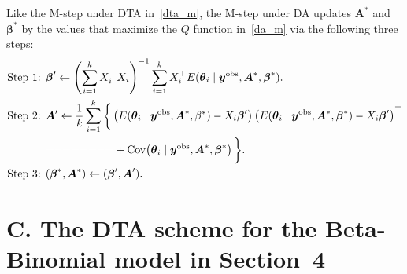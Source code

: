 \documentclass[12pt]{article}
\begin{document}
\begin{appendix}
Like the M-step under DTA in~\eqref{dta_m}, the M-step under DA updates $\boldsymbol{A}^\ast$ and $\boldsymbol{\beta}^\ast$ by the values that maximize the $Q$ function in~\eqref{da_m} via the following three steps:
\begin{align}
\begin{aligned}
\textrm{Step 1: }& \boldsymbol{\beta}' \gets\left(\sum_{i=1}^kX_i^\top X_i\right)^{-1}\sum_{i=1}^kX_i^\top E(
\boldsymbol{\theta}_i\mid \boldsymbol{y}^{\textrm{obs}}, \boldsymbol{A}^\ast, \boldsymbol{\beta}^\ast).\nonumber\\
\textrm{Step 2: }& \boldsymbol{A}' \gets \frac{1}{k}\sum_{i=1}^k\bigg\{\left(E(\boldsymbol{\theta}_i \mid \boldsymbol{y}^{\textrm{obs}}, \boldsymbol{A}^\ast, \beta^\ast)-X_i\boldsymbol{\beta}'\right)\left(E(\boldsymbol{\theta}_i\mid \boldsymbol{y}^{\textrm{obs}}, \boldsymbol{A}^\ast, \boldsymbol{\beta}^\ast)-X_i\boldsymbol{\beta}'\right)^\top\\
&\textcolor{white}{========}+\textrm{Cov}\!\left(\boldsymbol{\theta}_i\mid \boldsymbol{y}^{\textrm{obs}}, \boldsymbol{A}^\ast, \boldsymbol{\beta}^\ast\right)\bigg\}.\\
\textrm{Step 3: }& (\boldsymbol{\beta}^\ast, \boldsymbol{A}^\ast) \gets (\boldsymbol{\beta}', \boldsymbol{A}').\\
\end{aligned}
\end{align}




\section{C. The DTA scheme for the Beta-Binomial model  in Section~4}\label{app4}


\end{appendix}
\end{document}
